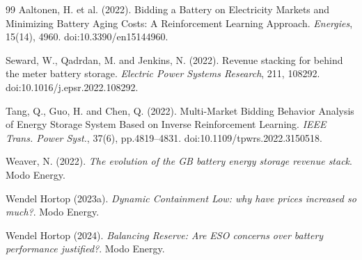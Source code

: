 \documentclass[12pt,a4paper]{article}
\begin{document}
\begin{thebibliography}{99}
Aaltonen, H. et al. (2022). Bidding a Battery on Electricity Markets and Minimizing Battery Aging Costs: A Reinforcement Learning Approach. \textit{Energies}, 15(14), 4960. doi:10.3390/en15144960.

Seward, W., Qadrdan, M. and Jenkins, N. (2022). Revenue stacking for behind the meter battery storage. \textit{Electric Power Systems Research}, 211, 108292. doi:10.1016/j.epsr.2022.108292.

Tang, Q., Guo, H. and Chen, Q. (2022). Multi-Market Bidding Behavior Analysis of Energy Storage System Based on Inverse Reinforcement Learning. \textit{IEEE Trans. Power Syst.}, 37(6), pp.4819--4831. doi:10.1109/tpwrs.2022.3150518.

Weaver, N. (2022). \textit{The evolution of the GB battery energy storage revenue stack}. Modo Energy.

Wendel Hortop (2023a). \textit{Dynamic Containment Low: why have prices increased so much?}. Modo Energy.

Wendel Hortop (2024). \textit{Balancing Reserve: Are ESO concerns over battery performance justified?}. Modo Energy.

\end{thebibliography}
\end{document}
